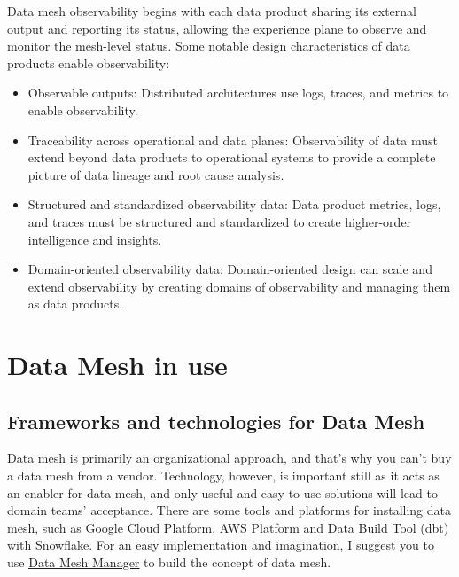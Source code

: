\documentclass[12pt, a4paper]{book}
\begin{document}
Data mesh observability begins with each data product sharing its external output and reporting its status, allowing the experience plane to observe and monitor the mesh-level status. Some notable design characteristics of data products enable observability:
	\begin{itemize}[nosep]
		\item Observable outputs: Distributed architectures use logs, traces, and metrics to enable observability.
		\item Traceability across operational and data planes: Observability of data must extend beyond data products to operational systems to provide a complete picture of data lineage and root cause analysis.
		\item Structured and standardized observability data: Data product metrics, logs, and traces must be structured and standardized to create higher-order intelligence and insights.
		\item Domain-oriented observability data: Domain-oriented design can scale and extend observability by creating domains of observability and managing them as data products.
	\end{itemize}

\let\cleardoublepage\clearpage
\chapter{Data Mesh in use}

\section{Frameworks and technologies for Data Mesh}
Data mesh is primarily an organizational approach, and that's why you can't buy a data mesh from a vendor. Technology, however, is important still as it acts as an enabler for data mesh, and only useful and easy to use solutions will lead to domain teams' acceptance. There are some tools and platforms for installing data mesh, such as Google Cloud Platform, AWS Platform and Data Build Tool (dbt) with Snowflake. \cite{datameshweb} For an easy implementation and imagination, I suggest you to use \href{https://datamesh-manager.com/}{\underline{Data Mesh Manager}} to build the concept of data mesh.
\end{document}
